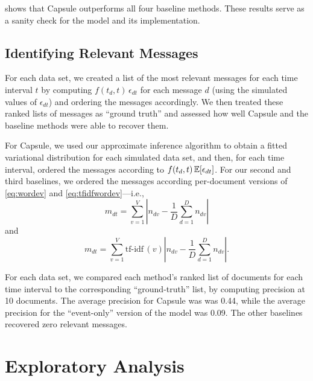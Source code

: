  shows that Capsule outperforms all four
baseline methods. These results serve as a sanity check for the model
and its implementation.


\subsection{Identifying Relevant Messages}

For each data set, we created a list of the most relevant messages for
each time interval $t$ by computing $f(t_d, t)\,\epsilon_{dt}$ for
each message $d$ (using the simulated values of $\epsilon_{dt}$) and
ordering the messages accordingly. We then treated these ranked lists
of messages as ``ground truth'' and assessed how well Capsule and the
baseline methods were able to recover them.

For Capsule, we used our approximate inference algorithm to obtain a
fitted variational distribution for each simulated data set, and then,
for each time interval, ordered the messages according to $f(t_d,
t)\,\mathbb{E}[\epsilon_{dt}]$. For our second and third baselines, we ordered
the messages according per-document versions of \cref{eq:wordev} and
\cref{eq:tfidfwordev}---i.e.,
\begin{equation}
  m_{dt} = \sum_{v=1}^V \left\lvert n_{dv} - \frac{1}{D}\sum_{d=1}^D
  n_{dv} \right\rvert
\end{equation}
and
\begin{equation}
  m_{dt} = \sum_{v=1}^V \textrm{tf-idf}\,(v) \left\lvert n_{dv} - \frac{1}{D}\sum_{d=1}^D
  n_{dv} \right\rvert.
\end{equation}

For each data set, we compared each method's ranked list of documents
for each time interval to the corresponding ``ground-truth'' list, by
computing precision at 10 documents. The average precision for Capsule
was was 0.44, while the average precision for the ``event-only''
version of the model was 0.09. The other baselines recovered zero
relevant messages.

\section{Exploratory Analysis}
\label{sec:eval}

